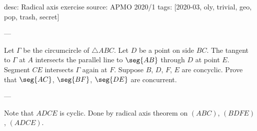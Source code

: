 desc: Radical axis exercise
source: APMO 2020/1
tags: [2020-03, oly, trivial, geo, pop, trash, secret]

---

Let $\Gamma$ be the circumcircle of $\triangle ABC$. Let $D$ be a point on side $BC$. The tangent to $\Gamma$ at $A$ intersects the parallel line to $\seg{AB}$ through $D$ at point $E$. Segment $CE$ intersects $\Gamma$ again at $F$. Suppose $B$, $D$, $F$, $E$ are concyclic. Prove that $\seg{AC}$, $\seg{BF}$, $\seg{DE}$ are concurrent.

---

Note that $ADCE$ is cyclic. Done by radical axis theorem on $(ABC)$, $(BDFE)$, $(ADCE)$.
